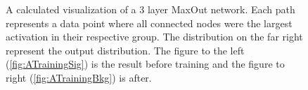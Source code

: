\begin{figure}
{\begin{subfigure}{.6\textwidth}
        \caption{}
        \label{fig:ATraining}
    \end{subfigure}
    }
    \caption{A calculated visualization of a 3 layer MaxOut network. Each path 
    represents a data point where all connected nodes were the largest activation in their respective 
    group. The distribution on the far right represent the output distribution. The figure to the left
    (\ref{fig:ATrainingSig}) is the result before training and the figure to right (\ref{fig:ATrainingBkg})
    is after.}
\end{figure}


\begin{figure}
\end{figure}
